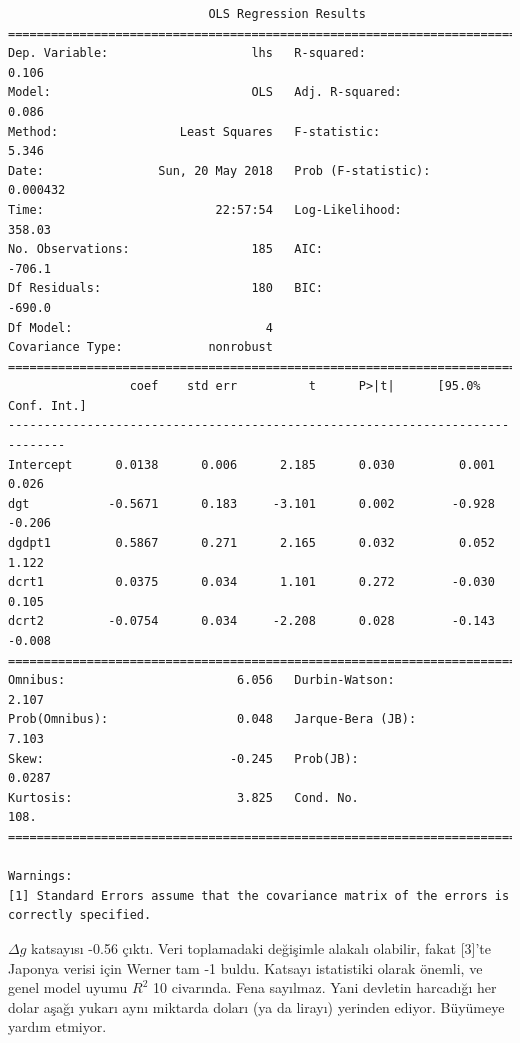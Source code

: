 \documentclass[12pt,fleqn]{article}\usepackage{../../common}
\begin{document}
\begin{verbatim}
                            OLS Regression Results                            
==============================================================================
Dep. Variable:                    lhs   R-squared:                       0.106
Model:                            OLS   Adj. R-squared:                  0.086
Method:                 Least Squares   F-statistic:                     5.346
Date:                Sun, 20 May 2018   Prob (F-statistic):           0.000432
Time:                        22:57:54   Log-Likelihood:                 358.03
No. Observations:                 185   AIC:                            -706.1
Df Residuals:                     180   BIC:                            -690.0
Df Model:                           4                                         
Covariance Type:            nonrobust                                         
==============================================================================
                 coef    std err          t      P>|t|      [95.0% Conf. Int.]
------------------------------------------------------------------------------
Intercept      0.0138      0.006      2.185      0.030         0.001     0.026
dgt           -0.5671      0.183     -3.101      0.002        -0.928    -0.206
dgdpt1         0.5867      0.271      2.165      0.032         0.052     1.122
dcrt1          0.0375      0.034      1.101      0.272        -0.030     0.105
dcrt2         -0.0754      0.034     -2.208      0.028        -0.143    -0.008
==============================================================================
Omnibus:                        6.056   Durbin-Watson:                   2.107
Prob(Omnibus):                  0.048   Jarque-Bera (JB):                7.103
Skew:                          -0.245   Prob(JB):                       0.0287
Kurtosis:                       3.825   Cond. No.                         108.
==============================================================================

Warnings:
[1] Standard Errors assume that the covariance matrix of the errors is correctly specified.
\end{verbatim}

$\Delta g$ katsayısı -0.56 çıktı. Veri toplamadaki değişimle alakalı
olabilir, fakat [3]'te Japonya verisi için Werner tam -1 buldu. Katsayı
istatistiki olarak önemli, ve genel model uyumu $R^2$ 10 civarında. Fena
sayılmaz. Yani devletin harcadığı her dolar aşağı yukarı aynı miktarda
doları (ya da lirayı) yerinden ediyor. Büyümeye yardım etmiyor.
\end{document}
